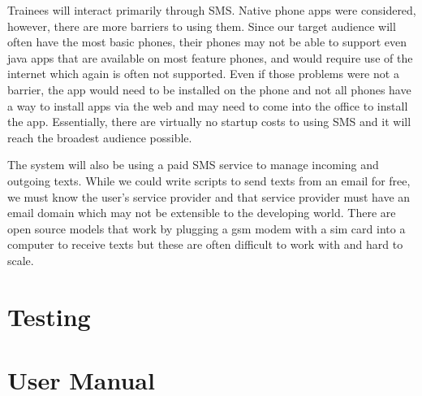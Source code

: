 Trainees will interact primarily through SMS. Native phone apps were considered, however, there are more barriers to using them. Since our target audience will often have the most basic phones, their phones may not be able to support even java apps that are available on most feature phones, and would require use of the internet which again is often not supported. Even if those problems were not a barrier, the app would need to be installed on the phone and not all phones have a way to install apps via the web and may need to come into the office to install the app. Essentially, there are virtually no startup costs to using SMS and it will reach the broadest audience possible.

The system will also be using a paid SMS service to manage incoming and outgoing texts. While we could write scripts to send texts from an email for free, we must know the user’s service provider and that service provider must have an email domain which may not be extensible to the developing world. There are open source models that work by plugging a gsm modem with a sim card into a computer to receive texts but these are often difficult to work with and hard to scale.

\section{Testing}

\section{User Manual}
